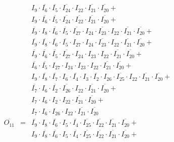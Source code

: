 \documentclass[a4paper,russian]{report}
\begin{document}
\begin{eqnarray*}
	& &  I_{9} \cdotp \overline{I_{6}} \cdotp \overline{I_{5}} \cdotp \overline{I_{24}} \cdotp I_{22} \cdotp \overline{I_{21}} \cdotp \overline{I_{20}} + \\
	& &  I_{9} \cdotp \overline{I_{6}} \cdotp \overline{I_{5}} \cdotp \overline{I_{24}} \cdotp \overline{I_{22}} \cdotp \overline{I_{21}} \cdotp \overline{I_{20}} + \\
	& &  \overline{I_{9}} \cdotp I_{8} \cdotp \overline{I_{6}} \cdotp \overline{I_{5}} \cdotp \overline{I_{27}} \cdotp I_{24} \cdotp \overline{I_{23}} \cdotp I_{22} \cdotp \overline{I_{21}} \cdotp \overline{I_{20}} + \\
	& &  \overline{I_{9}} \cdotp \overline{I_{8}} \cdotp \overline{I_{6}} \cdotp \overline{I_{5}} \cdotp I_{27} \cdotp I_{24} \cdotp \overline{I_{23}} \cdotp I_{22} \cdotp \overline{I_{21}} \cdotp \overline{I_{20}} + \\
	& &  \overline{I_{9}} \cdotp \overline{I_{6}} \cdotp \overline{I_{5}} \cdotp \overline{I_{27}} \cdotp I_{24} \cdotp I_{23} \cdotp I_{22} \cdotp \overline{I_{21}} \cdotp \overline{I_{20}} + \\
	& &  \overline{I_{6}} \cdotp \overline{I_{5}} \cdotp I_{27} \cdotp I_{24} \cdotp I_{23} \cdotp I_{22} \cdotp \overline{I_{21}} \cdotp \overline{I_{20}} + \\
	& &  I_{9} \cdotp \overline{I_{8}} \cdotp \overline{I_{7}} \cdotp I_{6} \cdotp \overline{I_{4}} \cdotp I_{3} \cdotp \overline{I_{2}} \cdotp I_{26} \cdotp \overline{I_{25}} \cdotp I_{22} \cdotp \overline{I_{21}} \cdotp \overline{I_{20}} + \\
	& &  \overline{I_{7}} \cdotp I_{6} \cdotp \overline{I_{2}} \cdotp \overline{I_{26}} \cdotp I_{22} \cdotp \overline{I_{21}} \cdotp \overline{I_{20}} + \\
	& &  I_{7} \cdotp I_{6} \cdotp I_{2} \cdotp I_{22} \cdotp \overline{I_{21}} \cdotp \overline{I_{20}} + \\
	& &  I_{7} \cdotp I_{6} \cdotp I_{26} \cdotp I_{22} \cdotp \overline{I_{21}} \cdotp \overline{I_{20}} \\
    \overline{O_{11}} & = & \overline{I_{9}} \cdotp I_{8} \cdotp \overline{I_{6}} \cdotp I_{5} \cdotp \overline{I_{4}} \cdotp \overline{I_{25}} \cdotp \overline{I_{22}} \cdotp \overline{I_{21}} \cdotp \overline{I_{20}} + \\
	& &  I_{9} \cdotp \overline{I_{8}} \cdotp \overline{I_{6}} \cdotp I_{5} \cdotp \overline{I_{4}} \cdotp \overline{I_{25}} \cdotp \overline{I_{22}} \cdotp \overline{I_{21}} \cdotp \overline{I_{20}} + \\

\end{eqnarray*}
\end{document}
